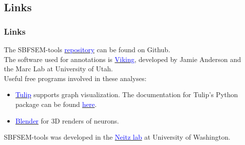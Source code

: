\documentclass[11pt]{beamer}
\begin{document}
\subsection*{Links}
\begin{frame}
	\frametitle{Links}
	The SBFSEM-tools \href{www.github.com/sarastokes/sbfsem-tools}{\textcolor{blue}{repository}} can be found on Github.\\
	The software used for annotations is \href{https://connectomes.utah.edu/}{\textcolor{blue}{Viking}}, developed by Jamie Anderson and the Marc Lab at University of Utah.\\
	Useful free programs involved in these analyses:
	\begin{itemize}
		\item \href{http://chip.de/downloads/Tulip-64-Bit_41528289.html}{\textcolor{blue}{Tulip}} supports graph visualization. The documentation for Tulip's Python package can be found \href{http://tulip.labri.fr/Documentation/4_10_0/tulip-python/html/index.html}{\textcolor{blue}{here}}.
		\item \href{http://www.blender.com}{\textcolor{blue}{Blender}} for 3D renders of neurons.
	\end{itemize}
	SBFSEM-tools was developed in the \href{http://www.neitzvision.com/}{\textcolor{blue}{Neitz lab}} at University of Washington.
\end{frame}	
\end{document}
